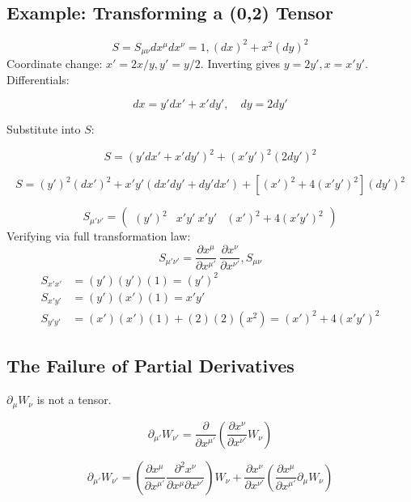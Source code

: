 \documentclass[11pt, a4paper]{report}
\begin{document}
\subsection*{Example: Transforming a (0,2) Tensor}
\begin{equation} S = S_{\mu\nu} dx^\mu dx^\nu = 1 , (dx)^2 + x^2 (dy)^2 \end{equation}
Coordinate change: $x' = 2x/y, y' = y/2$. Inverting gives $y = 2y', x = x'y'$.
Differentials:


$$ dx = y' dx' + x' dy', \quad dy = 2 dy' $$


Substitute into $S$:


$$ S = (y'dx' + x'dy')^2 + (x'y')^2 (2dy')^2 $$

$$ S = (y')^2 (dx')^2 + x'y' (dx'dy' + dy'dx') + \left[ (x')^2 + 4(x'y')^2 \right] (dy')^2 $$


\begin{equation} \label{S_transform} S_{\mu'\nu'} = \begin{pmatrix} (y')^2 & x'y' \ x'y' & (x')^2 + 4(x'y')^2 \end{pmatrix} \end{equation}
Verifying via full transformation law:
\begin{equation} S_{\mu'\nu'} = \frac{\partial x^\mu}{\partial x^{\mu'}} \ \frac{\partial x^\nu}{\partial x^{\nu'}} , S_{\mu \nu} \end{equation}
\begin{align*}
S_{x'x'} &= (y')(y')(1) = (y')^2 \\
S_{x'y'} &= (y')(x')(1) = x'y' \\
S_{y'y'} &= (x')(x')(1) + (2)(2)(x^2) = (x')^2 + 4(x'y')^2
\end{align*}

\subsection*{The Failure of Partial Derivatives}


$\partial_\mu W_\nu$ is not a tensor.


$$ \partial_{\mu'} W_{\nu'} = \frac{\partial}{\partial x^{\mu'}} \left( \frac{\partial x^\nu}{\partial x^{\nu'}} W_\nu \right) $$

$$ \partial_{\mu'} W_{\nu'} = \left( \frac{\partial x^\mu}{\partial x^{\mu'}} \frac{\partial^2 x^\nu}{\partial x^\mu \partial x^{\nu'}} \right) W_\nu + \frac{\partial x^\nu}{\partial x^{\nu'}} \left( \frac{\partial x^\mu}{\partial x^{\mu'}} \partial_\mu W_\nu \right) $$
\end{document}
